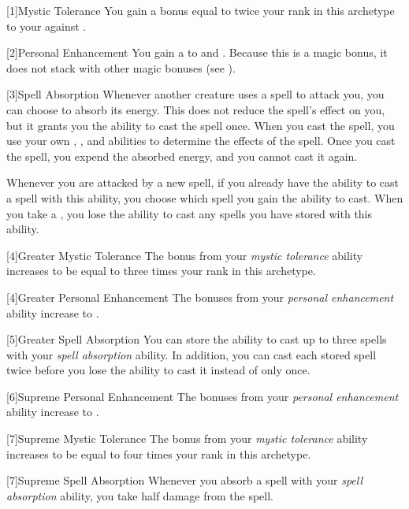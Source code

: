         [1]{Mystic Tolerance} You gain a bonus equal to twice your rank in this archetype to your  against .

        [2]{Personal Enhancement} You gain a   to  and .
        Because this is a magic bonus, it does not stack with other magic bonuses (see ).

        [3]{Spell Absorption} Whenever another creature uses a spell to attack you, you can choose to absorb its energy.
        This does not reduce the spell's effect on you, but it grants you the ability to cast the spell once.
        When you cast the spell, you use your own , , and abilities to determine the effects of the spell.
        Once you cast the spell, you expend the absorbed energy, and you cannot cast it again.

        Whenever you are attacked by a new spell, if you already have the ability to cast a spell with this ability, you choose which spell you gain the ability to cast.
        When you take a , you lose the ability to cast any spells you have stored with this ability.

        [4]{Greater Mystic Tolerance} The bonus from your \textit{mystic tolerance} ability increases to be equal to three times your rank in this archetype.

        [4]{Greater Personal Enhancement} The bonuses from your \textit{personal enhancement} ability increase to .

        [5]{Greater Spell Absorption} You can store the ability to cast up to three spells with your \textit{spell absorption} ability.
        In addition, you can cast each stored spell twice before you lose the ability to cast it instead of only once.

        [6]{Supreme Personal Enhancement} The bonuses from your \textit{personal enhancement} ability increase to .

        [7]{Supreme Mystic Tolerance} The bonus from your \textit{mystic tolerance} ability increases to be equal to four times your rank in this archetype.

        [7]{Supreme Spell Absorption} Whenever you absorb a spell with your \textit{spell absorption} ability, you take half damage from the spell.

